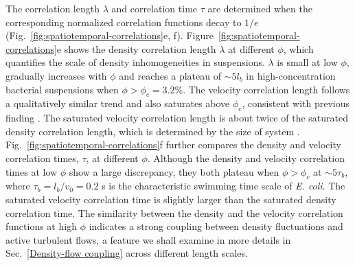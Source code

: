 \documentclass[twocolumn,aps,prx,amsmath,amssymb,longbibliography]{revtex4-2}
\begin{document}
The correlation length $\lambda$ and correlation time $\tau$ are determined when the corresponding normalized correlation functions decay to $1/e$ (Fig.~\ref{fig:spatiotemporal-correlations}e, f). Figure~\ref{fig:spatiotemporal-correlations}e shows the density correlation length $\lambda$ at different $\phi$, which quantifies the scale of density inhomogeneities in suspensions.
$\lambda$ is small at low $\phi$, gradually increases with $\phi$ and reaches a plateau of $\sim 5l_b$ in high-concentration bacterial suspensions when $\phi > \phi_c = 3.2\%$.
The velocity correlation length follows a qualitatively similar trend and also saturates above $\phi_c$, consistent with previous finding \cite{Sokolov2007}. The saturated velocity correlation length is about twice of the saturated density correlation length, which is determined by the size of system \cite{Guo2018}.  Fig.~\ref{fig:spatiotemporal-correlations}f further compares the density and velocity correlation times, $\tau$, at different $\phi$. Although the density and velocity correlation times at low $\phi$ show a large discrepancy, they both plateau when $\phi > \phi_c$ at $\sim 5\tau_b$, where $\tau_b=l_b/v_0=0.2$ s is the characteristic swimming time scale of \textit{E. coli}. The saturated velocity correlation time is slightly larger than the saturated density correlation time. The similarity between the density and the velocity correlation functions at high $\phi$ indicates a strong coupling between density fluctuations and active turbulent flows, a feature we shall
examine in more details in Sec.~\ref{Density-flow coupling} across different length scales.
\end{document}
